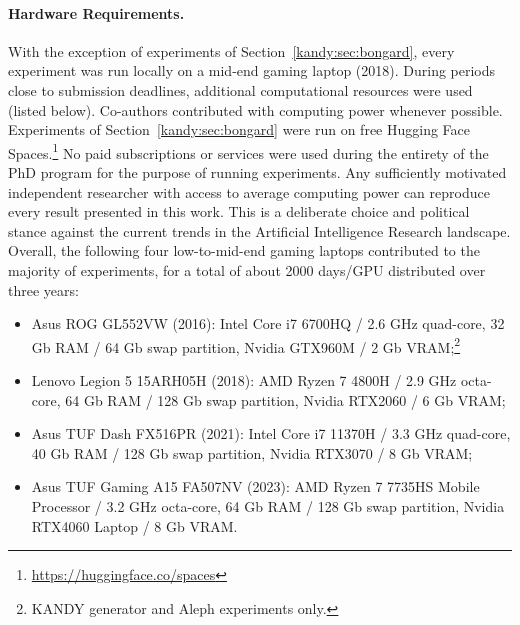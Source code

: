 \documentclass[a4paper,twoside,openright]{book}
\theoremstyle{plain}
\theoremstyle{definition}
\begin{document}
\paragraph{Hardware Requirements.} With the exception of experiments of Section~\ref{kandy:sec:bongard}, every experiment was run locally on a mid-end gaming laptop (2018). During periods close to submission deadlines, additional computational resources were used (listed below). Co-authors contributed with computing power whenever possible. Experiments of Section~\ref{kandy:sec:bongard} were run on free Hugging Face Spaces.\footnote{\url{https://huggingface.co/spaces}}
No paid subscriptions or services were used during the entirety of the PhD program for the purpose of running experiments. Any sufficiently motivated independent researcher with access to average computing power can reproduce every result presented in this work. This is a deliberate choice and political stance against the current trends in the Artificial Intelligence Research landscape.
%
Overall, the following four low-to-mid-end gaming laptops contributed to the majority of experiments, for a total of about 2000 days/GPU distributed over three years:
\begin{itemize}
	\item Asus ROG GL552VW (2016): Intel Core i7 6700HQ / 2.6 GHz quad-core, 32 Gb RAM / 64 Gb swap partition, Nvidia GTX960M / 2 Gb VRAM;\footnote{\textsc{KANDY} generator and Aleph experiments only.}
	\item Lenovo Legion 5 15ARH05H (2018): AMD Ryzen 7 4800H / 2.9 GHz octa-core, 64 Gb RAM / 128 Gb swap partition, Nvidia RTX2060 / 6 Gb VRAM;
	\item Asus TUF Dash FX516PR (2021): Intel Core i7 11370H / 3.3 GHz quad-core, 40 Gb RAM / 128 Gb swap partition, Nvidia RTX3070 / 8 Gb VRAM;
	\item Asus TUF Gaming A15 FA507NV (2023): AMD Ryzen 7 7735HS Mobile Processor / 3.2 GHz octa-core, 64 Gb RAM / 128 Gb swap partition, Nvidia RTX4060 Laptop / 8 Gb VRAM.
\end{itemize}
\end{document}
